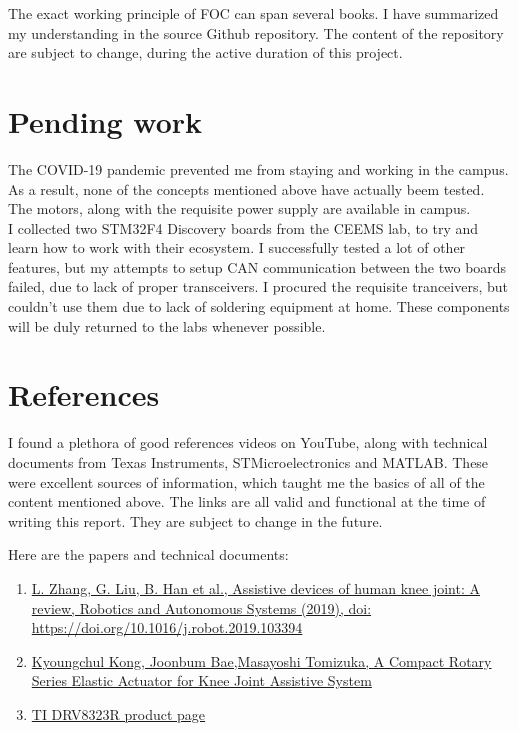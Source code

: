 \documentclass[a4paper]{article}
\begin{document}
		The exact working principle of FOC can span several books. I have summarized my understanding in the source Github repository. The content of the repository are subject to change, during the active duration of this project.

	\section{Pending work}
		The COVID-19 pandemic prevented me from staying and working in the campus. As a result, none of the concepts mentioned above have actually beem tested. The motors, along with the requisite power supply are available in campus.\\

		 I collected two STM32F4 Discovery boards from the CEEMS lab, to try and learn how to work with their ecosystem. I successfully tested a lot of other features, but my attempts to setup CAN communication between the two boards failed, due to lack of proper transceivers. I procured the requisite tranceivers, but couldn't use them due to lack of soldering equipment at home. These components will be duly returned to the labs whenever possible.

	\pagebreak
	\section{References}
		I found a plethora of good references videos on YouTube, along with technical documents from Texas Instruments, STMicroelectronics and MATLAB. These were excellent sources of information, which taught me the basics of all of the content mentioned above. The links are all valid and functional at the time of writing this report. They are subject to change in the future.

		Here are the papers and technical documents:
		\begin{enumerate}
			\item\href{https://doi.org/10.1016/j.robot.2019.103394}{L. Zhang, G. Liu, B. Han et al., Assistive devices of human knee joint: A
				review, Robotics and Autonomous Systems (2019), doi:
				https://doi.org/10.1016/j.robot.2019.103394}
			\item \href{https://ieeexplore.ieee.org/document/5509227}{Kyoungchul Kong, Joonbum Bae,Masayoshi Tomizuka, A Compact Rotary Series Elastic Actuator for Knee Joint Assistive System}
			\item \href{https://www.ti.com/product/DRV8323R#tech-docs}{TI DRV8323R product page}
		\end{enumerate}
\end{document}
